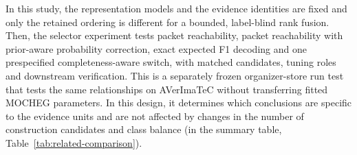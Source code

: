 In this study, the representation models and the evidence identities are fixed and only the retained ordering is different for a bounded, label-blind rank fusion. Then, the selector experiment tests packet reachability, packet reachability with prior-aware probability correction, exact expected F1 decoding and one prespecified completeness-aware switch, with matched candidates, tuning roles and downstream verification. This is a separately frozen organizer-store run test that tests the same relationships on AVerImaTeC without transferring fitted MOCHEG parameters. In this design, it determines which conclusions are specific to the evidence units and are not affected by changes in the number of construction candidates and class balance (in the summary table, Table~\ref{tab:related-comparison}).
